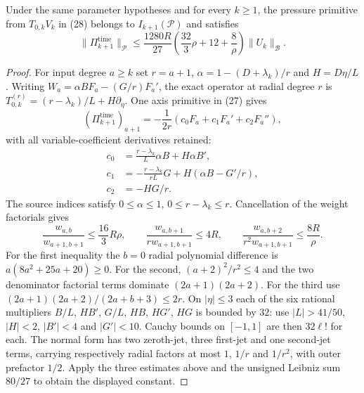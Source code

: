 \begin{theorem}
\label{thm:time-pressure-shifted}
Under the same parameter hypotheses and for every $k\ge1$,
the pressure primitive from $T_{0,k}V_k$ in (28) belongs
to $I_{k+1}(\mathcal P)$ and satisfies
\begin{equation}\label{eq:time-pressure-shifted-bound}
\|\Pi_{k+1}^{\mathrm{time}}\|_{\mathcal P}
\le\frac{1280R}{27}
\left(\frac{32}{3}\rho+12+\frac8\rho\right)
\|U_k\|_{\mathcal B}.
\end{equation}
\end{theorem}
\begin{proof}
For input degree $a\ge k$ set $r=a+1$,
$\alpha=1-(D+\lambda_k)/r$ and $H=D\eta/L$.
Writing $W_a=\alpha BF_a-(G/r)F_a'$,
the exact operator at radial degree $r$ is
$T_{0,k}^{(r)}=(r-\lambda_k)/L+H\partial_\eta$.
One axis primitive in (27) gives
\begin{equation}\label{eq:time-pressure-exact-normal}
(\Pi_{k+1}^{\mathrm{time}})_{a+1}
=-\frac1{2r}(c_0F_a+c_1F_a'+c_2F_a''),
\end{equation}
with all variable-coefficient derivatives retained:
\begin{align*}
c_0&=\frac{r-\lambda_k}{L}\alpha B+H\alpha B',\\
c_1&=-\frac{r-\lambda_k}{rL}G
       +H(\alpha B-G'/r),\\
c_2&=-HG/r.
\end{align*}
The source indices satisfy
$0\le\alpha\le1$, $0\le r-\lambda_k\le r$.
Cancellation of the weight factorials gives
\begin{equation}\label{eq:time-pressure-three-ratios}
\frac{w_{a,b}}{w_{a+1,b+1}}
\le\frac{16}{3}R\rho,\qquad
\frac{w_{a,b+1}}{r w_{a+1,b+1}}\le4R,\qquad
\frac{w_{a,b+2}}{r^2w_{a+1,b+1}}\le\frac{8R}{\rho}.
\end{equation}
For the first inequality the $b=0$ radial polynomial difference
is $a(8a^2+25a+20)\ge0$. For the second,
$(a+2)^2/r^2\le4$ and the two denominator factorial
terms dominate $(2a+1)(2a+2)$. For the third use
$(2a+1)(2a+2)/(2a+b+3)\le2r$.
On $|\eta|\le3$ each of the six rational multipliers
$B/L$, $HB'$, $G/L$, $HB$, $HG'$, $HG$
is bounded by $32$: use $|L|>41/50$, $|H|<2$,
$|B'|<4$ and $|G'|<10$.
Cauchy bounds on $[-1,1]$ are then
$32\ell!$ for each. The normal form has two
zeroth-jet, three first-jet and one second-jet terms,
carrying respectively radial factors at most $1$,
$1/r$ and $1/r^2$, with outer prefactor $1/2$.
Apply the three estimates above and the unsigned
Leibniz sum $80/27$ to obtain the displayed constant.
\end{proof}

